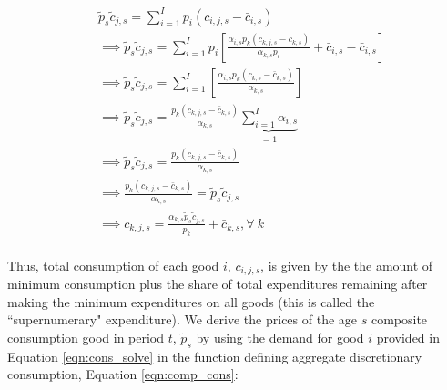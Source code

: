 \documentclass[letterpaper,12pt]{article}
\theoremstyle{definition}
\begin{document}
\begin{spacing}{1.5}
          \begin{equation} \label{eqn:cons_solve}
      \begin{split}
       & \tilde{p}_{s}\tilde{c}_{j,s} = \sum_{i=1}^{I}p_{i}(c_{i,j,s}-\bar{c}_{i,s}) \\
       & \implies  \tilde{p}_{s}\tilde{c}_{j,s} = \sum_{i=1}^{I}p_{i}\left[ \frac{\alpha_{i,s} p_{k}(c_{k,j,s}-\bar{c}_{k,s})}{\alpha_{k,s} p_{i}} + \bar{c}_{i,s}- \bar{c}_{i,s}\right] \\
       & \implies  \tilde{p}_{s}\tilde{c}_{j,s} = \sum_{i=1}^{I}\left[ \frac{\alpha_{i,s} p_{k}(c_{k,s}-\bar{c}_{k,s})}{\alpha_{k,s}}\right] \\
       & \implies  \tilde{p}_{s}\tilde{c}_{j,s} = \frac{ p_{k}(c_{k,j,s}-\bar{c}_{k,s})}{\alpha_{k,s}} \underbrace{\sum_{i=1}^{I}\alpha_{i,s}}_{=1} \\	
        & \implies  \tilde{p}_{s}\tilde{c}_{j,s} = \frac{ p_{k}(c_{k,j,s}-\bar{c}_{k,s})}{\alpha_{k,s}} \\
        & \implies  \frac{ p_{k}(c_{k,j,s}-\bar{c}_{k,s})}{\alpha_{k,s}}  = \tilde{p}_{s}\tilde{c}_{j,s}   \\	
        & \implies  c_{k,j,s}  = \frac{\alpha_{k,s} \tilde{p}_{s}\tilde{c}_{j,s}}{p_{k}} + \bar{c}_{k,s},  \forall \ k  \\	
       \end{split}
    \end{equation}
    
    Thus, total consumption of each good $i$, $c_{i,j,s}$, is given by the the amount of minimum consumption plus the share of total expenditures remaining after making the minimum expenditures on all goods (this is called the ``supernumerary" expenditure).  We derive the prices of the age $s$ composite consumption good in period $t$, $\tilde{p}_{s}$ by using the demand for good $i$ provided in Equation \ref{eqn:cons_solve} in the function defining aggregate discretionary consumption, Equation \ref{eqn:comp_cons}: 
    

\end{spacing}
\end{document}
